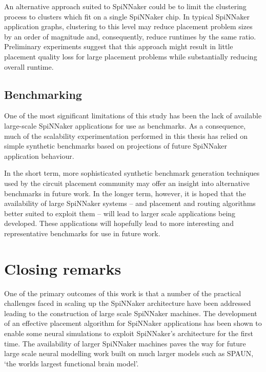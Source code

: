 			An alternative approach suited to SpiNNaker could be to limit the
			clustering process to clusters which fit on a single SpiNNaker chip. In
			typical SpiNNaker application graphs, clustering to this level may reduce
			placement problem sizes by an order of magnitude and, consequently,
			reduce runtimes by the same ratio. Preliminary experiments suggest that
			this approach might result in little placement quality loss for large
			placement problems while substantially reducing overall runtime.
		
		\subsection{Benchmarking}
			
			One of the most significant limitations of this study has been the lack
			of available large-scale SpiNNaker applications for use as benchmarks. As
			a consequence, much of the scalability experimentation performed in this
			thesis has relied on simple synthetic benchmarks based on projections of
			future SpiNNaker application behaviour.
			
			In the short term, more sophisticated synthetic benchmark generation
			techniques used by the circuit placement community \cite{nam07} may offer
			an insight into alternative benchmarks in future work.  In the longer
			term, however, it is hoped that the availability of large SpiNNaker
			systems -- and placement and routing algorithms better suited to exploit
			them -- will lead to larger scale applications being developed. These
			applications will hopefully lead to more interesting and representative
			benchmarks for use in future work.
	
	\section{Closing remarks}
		
		One of the primary outcomes of this work is that a number of the practical
		challenges faced in scaling up the SpiNNaker architecture have been
		addressed leading to the construction of large scale SpiNNaker machines.
		The development of an effective placement algorithm for SpiNNaker
		applications has been shown to enable some neural simulations to exploit
		SpiNNaker's architecture for the first time. The availability of larger
		SpiNNaker machines paves the way for future large scale neural modelling
		work built on much larger models such as SPAUN, `the worlds largest
		functional brain model'.
		
